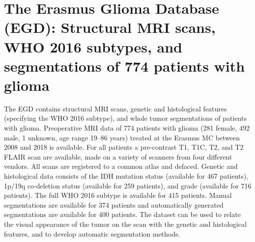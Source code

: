 
\chapter[The Erasmus Glioma Database (EGD): Structural MRI scans, WHO 2016 subtypes, and segmentations of 774 patients with glioma][Erasmus Glioma Database]{The Erasmus Glioma Database (EGD): Structural MRI scans, WHO 2016 subtypes, and segmentations of 774 patients with glioma}\label{chap:EGD}



\begin{ChapterAbstract}
The \gls{EGD} contains structural \gls{MRI} scans, genetic and histological features (specifying the \acrshort{WHO} 2016 subtype), and whole \gls{tumor} segmentations of patients with glioma.
Preoperative \gls{MRI} data of 774 patients with glioma (281 female, 492 male, 1 unknown, age range 19--86 years) treated at the Erasmus MC between 2008 and 2018 is available.
For all patients a pre-contrast \acrlong{T1}, \acrlong{T1C}, \acrlong{T2}, and \acrlong{T2} FLAIR scan are available, made on a variety of scanners from four different vendors.
All scans are registered to a common atlas and defaced.
Genetic and histological data consists of the \acrshort{IDH} mutation status (available for 467 patients), 1p/19q co-deletion status (available for 259 patients), and grade (available for 716 patients).
The full \acrshort{WHO} 2016 subtype is available for 415 patients.
Manual segmentations are available for 374 patients and automatically generated segmentations are available for 400 patients.
The dataset can be used to relate the visual appearance of the \gls{tumor} on the scan with the genetic and histological features, and to develop automatic segmentation methods.
\end{ChapterAbstract}

